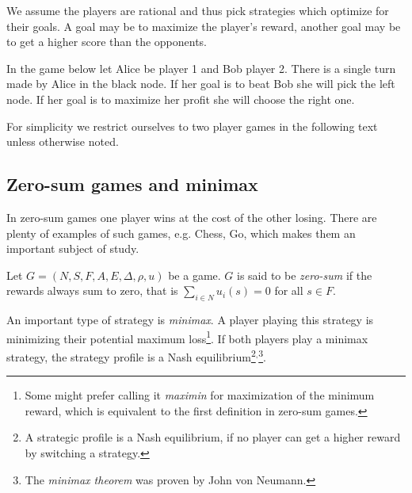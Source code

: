 We assume the players are rational and thus pick strategies which
optimize for their goals. A goal may be to maximize the player's reward,
another goal may be to get a higher score than the opponents.

\begin{example}
    \label{example_goals}
    In the game below let Alice be player 1 and Bob player 2.
    There is a single turn made by Alice in the black node.
If her goal is to beat Bob she will pick the left node.
If her goal is to maximize her profit she will choose the right one.

    \begin{center}
\end{center}
\end{example}

For simplicity we restrict
ourselves to two player games in the following text unless otherwise
noted.


\subsection{Zero-sum games and minimax}

In zero-sum games one player wins at the cost of the other losing.
There are plenty of examples of such games, e.g. Chess, Go, which makes
them an important subject of study.

\begin{definition}
    Let $G = (N, S, F, A, E, \Delta, \rho, u)$ be a game.
    $G$ is said to be {\em zero-sum} if the rewards always sum to zero,
    that is $\sum_{i \in N} u_i(s) = 0$ for all $s \in F$.
\end{definition}

An important type of strategy is {\em minimax}. A player playing this
strategy is minimizing their potential maximum loss\footnote{Some might
prefer calling it {\em maximin} for maximization of the minimum reward,
which is equivalent to the first definition in zero-sum games.}. If both players play a
minimax strategy, the strategy profile is a Nash
equilibrium\footnote{
A strategic profile is a Nash equilibrium, if no player can get a higher
reward by switching a strategy.
    }$^,$\footnote{The {\em minimax theorem} was proven by John
von Neumann.}.


